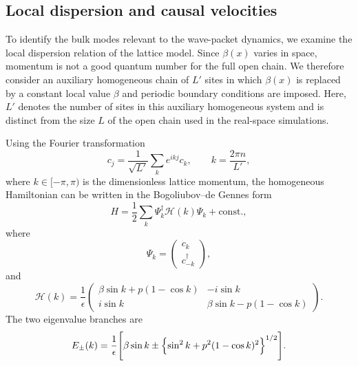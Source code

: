 \documentclass[reprint,amsmath,amssymb,aps,prb,floatfix,showkeys,superscriptaddress]{revtex4-2}
\begin{document}
\subsection{Local dispersion and causal velocities}
\label{subsec:dispersion}

To identify the bulk modes relevant to the wave-packet dynamics, we
examine the local dispersion relation of the lattice model. Since
$\beta(x)$ varies in space, momentum is not a good quantum number for
the full open chain. We therefore consider an auxiliary homogeneous
chain of $L'$ sites in which $\beta(x)$ is replaced by a constant
local value $\beta$ and periodic boundary conditions are imposed.
Here, $L'$ denotes the number of sites in this auxiliary homogeneous
system and is distinct from the size $L$ of the open chain used in
the real-space simulations.

Using the Fourier transformation
\begin{equation}
  c_j
  =
  \frac{1}{\sqrt{L'}}
  \sum_{k}
  e^{ikj}c_{k},
  \qquad
  k=\frac{2\pi n}{L'},
  \label{eq:Fourier_transform}
\end{equation}
where $k\in[-\pi,\pi)$ is the dimensionless lattice momentum,
the homogeneous Hamiltonian can be written in the
Bogoliubov--de Gennes form
\begin{equation}
  H
  =
  \frac{1}{2}
  \sum_{k}
  \Psi_{k}^{\dagger}
  \mathcal{H}(k)
  \Psi_{k}
  +\mathrm{const.},
  \label{eq:BdG_Hamiltonian}
\end{equation}
where
\begin{equation}
  \Psi_{k}
  =
  \begin{pmatrix}
    c_{k}\\
    c_{-k}^{\dagger}
  \end{pmatrix},
  \label{eq:Nambu_spinor}
\end{equation}
and
\begin{equation}
  \mathcal{H}(k)
  =
  \frac{1}{\epsilon}
  \begin{pmatrix}
    \beta\sin k
    +p(1-\cos k)
      & -i\sin k
    \\
    i\sin k
      & \beta\sin k
        -p(1-\cos k)
  \end{pmatrix}.
  \label{eq:BdG_matrix}
\end{equation}
The two eigenvalue branches are
\begin{equation}
\begin{aligned}
  E_{\pm}(k)
  =
  \frac{1}{\epsilon}
  \Biggl[
    \beta\sin k
    \mathbin{\pm}
    \Bigl\{
      \sin^{2}k
      +p^{2}(1-\cos k)^{2}
    \Bigr\}^{1/2}
  \Biggr].
\end{aligned}
  \label{eq:lattice_dispersion}
\end{equation}
\end{document}

